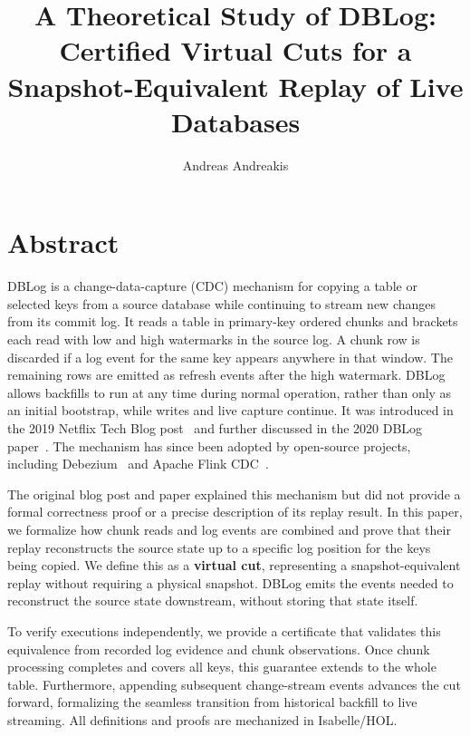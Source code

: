 \documentclass[letterpaper,10pt,twocolumn]{article}
\title{A Theoretical Study of DBLog: Certified Virtual Cuts for a Snapshot-Equivalent Replay of Live Databases}
\author{Andreas Andreakis}
\date{}
\makeatletter
\renewcommand{\maketitle}{%
  \twocolumn[{%
    \begin{center}
      {\LARGE\bfseries \@title\par}
      \vspace{1.1em}
      {\large \@author\par}
    \end{center}
    \vspace{1.5em}
  }]%
  \thispagestyle{plain}%
}
\makeatother
\begin{document}
\maketitle

\section*{Abstract}\label{abstract}

DBLog is a change-data-capture (CDC) mechanism for copying a table or
selected keys from a source database while continuing to stream new changes
from its commit log. It reads a table in primary-key ordered chunks and 
brackets each read with low and high watermarks in the source log. A chunk
row is discarded if a log event for the same key appears anywhere in that
window. The remaining rows are emitted as refresh events after the high
watermark. DBLog allows backfills to run at any time during normal operation,
rather than only as an initial bootstrap, while writes and live capture
continue. It was introduced in the 2019 Netflix Tech Blog
post~\citep{dblog_netflix_blog} and further discussed in the 2020 DBLog
paper~\citep{andreakis2020dblog}. The mechanism has since been adopted by
open-source projects, including Debezium~\citep{debezium_incremental_snapshot}
and Apache Flink CDC~\citep{flink_cdc_incremental_snapshot}.

The original blog post and paper explained this mechanism but did not provide
a formal correctness proof or a precise description of its replay result. In
this paper, we formalize how chunk reads and log events are
combined and prove that their replay reconstructs the source state up to a
specific log position for the keys being copied. We define this as a
\textbf{virtual cut}, representing a snapshot-equivalent replay without
requiring a physical snapshot. DBLog emits the events needed to reconstruct 
the source state downstream, without storing that state itself.

To verify executions independently, we provide a certificate that validates
this equivalence from recorded log evidence and chunk observations. Once chunk 
processing completes and covers all keys, this guarantee extends to the whole table. 
Furthermore, appending subsequent change-stream events advances the cut forward, 
formalizing the seamless transition from historical backfill to live streaming. 
All definitions and proofs are mechanized in Isabelle/HOL.
\end{document}
